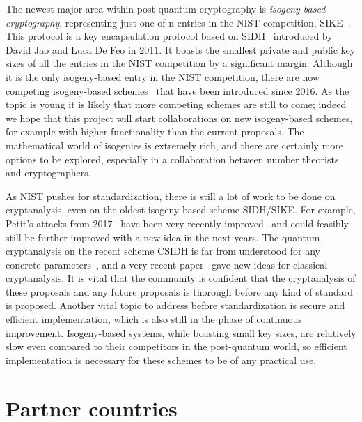 \documentclass{article}
\begin{document}
The newest major area within post-quantum cryptography is \emph{isogeny-based cryptography}, representing just one of n entries in the NIST competition, SIKE~\cite{SIKE}. 
This protocol is a key encapsulation protocol based on SIDH~\cite{SIDH} introduced by David Jao and Luca De Feo in 2011.
It boasts the smallest private and public key sizes of all the entries in the NIST competition by a significant margin.
Although it is the only isogeny-based entry in the NIST competition,
there are now competing isogeny-based schemes~\cite{CSIDH, CSURF, CSIFiSh}
that have been introduced since 2016.
As the topic is young it is likely that more competing schemes are still to come;
indeed we hope that this project will start collaborations on new isogeny-based schemes, for example with higher functionality than the current proposals.
The mathematical world of isogenies is extremely rich,
and there are certainly more options to be explored, especially in a collaboration between number theorists and cryptographers.

As NIST pushes for standardization, there is still a lot of work to be done on cryptanalysis, even on the oldest isogeny-based scheme SIDH/SIKE. 
For example, Petit's attacks from 2017~\cite{Petit17} 
have been very recently improved~\cite{KMPPS20}
and could feasibly still be further improved with a new idea in the next years.
The quantum cryptanalysis on the recent scheme CSIDH is far from understood for any concrete parameters~\cite{simons-talk},
and a very recent paper~\cite{characters} gave new ideas for classical cryptanalysis.
It is vital that the community is confident that the cryptanalysis of these proposals
and any future proposals is thorough before any kind of standard is proposed.
Another vital topic to address before standardization is secure and efficient implementation, which is also still in the phase of continuous improvement. 
Isogeny-based systems, while boasting small key sizes,
are relatively slow even compared to their competitors in the post-quantum world,
so efficient implementation is necessary for these schemes to be of any practical use.

\section{Partner countries}
\end{document}
